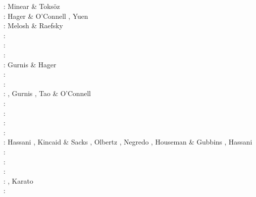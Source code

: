 \begin{scriptsize}
\noindent
\nineteenseventy: Minear \& Toks{\"o}z \cite{mito70}\\
\nineteenseventyeight: Hager \& O'Connell \cite{haoc78}, Yuen \etal \cite{yufs78}\\
\nineteeneighty: Melosh \& Raefsky \cite{mera80}\\
\nineteeneightytwo: \cite{crpi82}\\
\nineteeneightyfive: \cite{thar85}\\
\nineteeneightysix: \cite{jarr86}\cite{mipb96}\\
\nineteeneightyeight: Gurnis \& Hager \cite{guha88}\\
\nineteeneightynine: \cite{boww89}\cite{mibj89}\cite{hesw89}\\
\nineteenninety: \cite{hstt90}\cite{kiha90}\\
\nineteenninetytwo: \cite{zhgu92}\cite{whbw92}, 
                    Gurnis \cite{gurn92}, Tao \& O'Connell \cite{taoc92}\\
\nineteenninetythree: \cite{jope93}\cite{dvnm93}\cite{wibf93}\cite{shem93}\\
\nineteenninetyfour: \cite{zhgu94}\cite{wibe94}\cite{wdbo94a}\cite{wdbo94b}\cite{bequ94}\cite{gaha94}\\
\nineteenninetyfive: \cite{masa95}\\
\nineteenninetysix: \cite{chri96}\cite{gisb96}
                    \cite{wabe96}\cite{zhgu96}\\
\nineteenninetyseven: Hassani \etal \cite{hajc97}, Kincaid \& Sacks \cite{kisa97}, 
                      Olbertz \etal \cite{olwh97}, Negredo \etal \cite{nesg97}, 
                      Houseman \& Gubbins \cite{hogu97}, Hassani \etal \cite{hajc97}\\
\nineteenninetyeight: \cite{itki98}\cite{buwg98}
                      \cite{brmy98}\cite{jabf98}
                      \cite{wabb98}\\
\nineteenninetynine: \cite{hagu99}\cite{befo99}\cite{bumo99}\cite{roda99}
                     \cite{elbp99}\cite{scmr99}\cite{elbe99}
                     \cite{beep99}\cite{nesb99}\\
\twothousand: \cite{tesc00}\cite{brky00}\cite{bemh00}\cite{chlb00}\\
\twothousandone: \cite{bujl01}\cite{bugw01}\cite{chys01}\cite{coha01}, Karato \etal \cite{kary01}\\
\twothousandtwo: \cite{civv02}\cite{clbb02}\cite{gesp02}\cite{ster02}\cite{jabn02}\\

\end{scriptsize}
